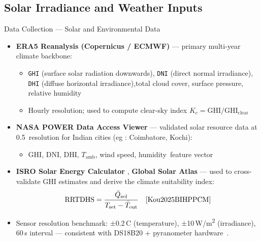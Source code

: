 \documentclass[aspectratio=169, 11pt]{beamer}
\begin{document}
\subsection{Solar Irradiance and Weather Inputs}
\begin{frame}{Data Collection --- Solar and Environmental Data}
\begin{itemize}


    \item \textbf{ERA5 Reanalysis (Copernicus / ECMWF)} \cite{ERA5} --- 
    primary multi-year climate backbone:
    \begin{itemize}
        \item \texttt{GHI} (surface solar radiation downwards), 
              \texttt{DNI} (direct normal irradiance), 
              \texttt{DHI} (diffuse horizontal irradiance),total cloud cover, surface pressure, relative humidity
        \item Hourly resolution; used to compute clear-sky index 
              $K_c = \text{GHI}/\text{GHI}_\text{clear}$ 
              \cite{Ghodusinejad2026SolarForecast}
    \end{itemize}

    \item \textbf{NASA POWER Data Access Viewer} \cite{NASAPOWER} --- 
    validated solar resource data at 0.5\textdegree\ resolution for Indian cities (eg : Coimbatore, Kochi):
    \begin{itemize}
        \item GHI, DNI, DHI, $T_\text{amb}$, wind speed, humidity\ feature vector 
    \end{itemize}

    \item \textbf{ISRO Solar Energy Calculator} \cite{ISROSolarCalculator}, 
    \textbf{Global Solar Atlas} \cite{GlobalSolarAtlasIndia} --- used to 
    cross-validate GHI estimates and derive the climate suitability index:
    \[
      \text{RRTDHS} = \frac{\bar{Q}_\text{sol}}{T_\text{set} - 
      \bar{T}_\text{out}} \quad \text{\cite{Kou2025BIHPPCM}}
    \]

    \item Sensor resolution benchmark: $\pm$0.2\,\textdegree C (temperature), 
    $\pm$10\,W/m\textsuperscript{2} (irradiance), 60\,s interval --- 
    consistent with DS18B20 + pyranometer hardware\ \cite{Kou2025BIHPPCM}.
\end{itemize}
\end{frame}
\end{document}
